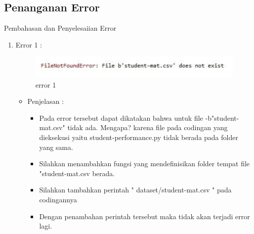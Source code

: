 \subsection{Penanganan Error}
\par Pembahasan dan Penyelesaiian Error
\par
\begin{enumerate}
\item Error 1	: 
\par
\par

\begin{figure}[ht]
\centering
\includegraphics[scale=0.4]{figures/errorr.jpg}
\caption{error 1}
\label{contoh}
\end{figure}

\par
\begin{itemize}
\item Penjelasan	: 
\begin{itemize}
\item Pada error tersebut  dapat dikatakan bahwa untuk file -b"student-mat.csv" tidak ada. Mengapa? karena file pada codingan yang dieksekusi yaitu student-performance.py tidak berada pada folder yang sama.
\item Silahkan menambahkan fungsi yang mendefinisikan folder tempat file "student-mat.csv berada. 
\item Silahkan tambahkan perintah " dataset/student-mat.csv " pada codingannya
\item Dengan penambahan perintah tersebut maka tidak akan terjadi error lagi.
\end{itemize}
\end{itemize}

\end{enumerate}